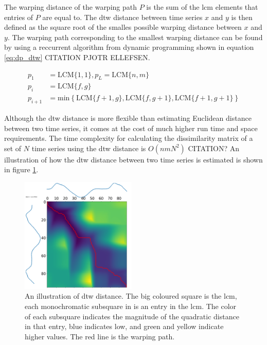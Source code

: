 The warping distance of the warping path $P$ is the sum of the \acrshort{lcm} elements that entries of $P$ are equal to. The \acrshort{dtw} distance between time series $x$ and $y$ is then defined as the square root of the smalles possible warping distance between $x$ and $y$. The warping path corresponding to the smallest warping distance can be found by using a reccurrent algorithm from dynamic programming shown in equation \eqref{eq:dp_dtw} CITATION PJOTR ELLEFSEN.

\begin{equation}
    \begin{split}
        p_1     &= \mathrm{LCM}\{ 1,1 \}, p_L = \mathrm{LCM}\{ n,m \}  \\
        p_{i}   &= \mathrm{LCM}\{ f,g \} \\
        p_{i+1} &= \mathrm{min} \left \{ \mathrm{LCM} \{ f+1,g\}, \mathrm{LCM} \{ f,g+1\}, \mathrm{LCM} \{ f+1,g+1\} \right  \}
    \end{split}
    \label{eq:dp_dtw}
\end{equation}

Although the \acrshort{dtw} distance is more flexible than estimating Euclidean distance between two time series, it comes at the cost of much higher run time and space requirements. The time complexity for calculating the dissimilarity matrix of a set of $N$ time series using the \acrshort{dtw} distance is $O\left ( n m N^{2} \right )$ CITATION? %
An illustration of how the \acrshort{dtw} distance between two time series is estimated is shown in figure \ref{fig:warping_path}. 

\begin{figure}
    \centering
    \includegraphics[width=0.49\textwidth]{machine-learning/warping_path_2_curves.png}
    \caption{An illustration of \acrshort{dtw} distance. The big coloured square is the \acrshort{lcm}, each monochromatic subsquare in is an entry in the \acrshort{lcm}. The color of each subsquare indicates the magnitude of the quadratic distance in that entry, blue indicates low, and green and yellow indicate higher values. The red line is the warping path.}
    \label{fig:warping_path}
\end{figure}

